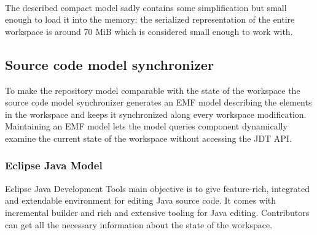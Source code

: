 \paragraph{}
The described compact model sadly contains some simplification but small enough to
load it into the memory: the serialized representation of the entire workspace is
around 70 MiB which is considered small enough to work with. 

\subsection{Source code model synchronizer}
To make the repository model comparable with the state of the workspace the
source code model synchronizer generates an EMF model describing the elements
in the workspace and keeps it synchronized along every workspace modification.
Maintaining an EMF model lets the model queries component dynamically examine
the current state of the workspace without accessing the JDT API.

\subsubsection{Eclipse Java Model}
Eclipse Java Development Tools main objective is to give feature-rich,
integrated and extendable environment for editing Java source code. It comes
with incremental builder and rich and extensive tooling for Java editing.
Contributors can get all the necessary information about the state of the
workspace.


